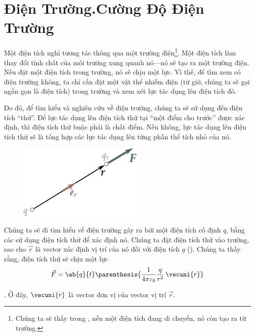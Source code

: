 \section{Điện Trường.Cường Độ Điện Trường}\label{sec:1_5}

Một điện tích nghỉ tương tác thông qua một trường điện\footnote{Chúng ta sẽ thấy trong , nếu một điện tích đang di chuyển, nó còn tạo ra từ trường.}. Một điện tích làm thay đổi tính chất của môi trường xung quanh nó---nó sẽ tạo ra một trường điện. Nếu đặt một điện tích trong trường, nó sẽ chịu một lực. Vì thế, để tìm xem có điện trường không, ta chỉ cần đặt một vật thể nhiễm điện (từ giờ, chúng ta sẽ gọi ngắn gọn là điện tích) trong trường và xem xét lực tác dụng lên điện tích đó.

Do đó, để tìm hiểu và nghiên cứu về điện trường, chúng ta sẽ sử dụng đến điện tích ``thử''. Để lực tác dụng lên điện tích thử tại ``một điểm cho trước'' được xác định, thì điện tích thử buộc phải là chất điểm. Nếu không, lực tác dụng lên điện tích thử sẽ là tổng hợp các lực tác dụng lên từng phần thể tích nhỏ của nó. 

\begin{figure}[!htb]
	\begin{center}
		\includegraphics[scale=1]{figures/ch_01/fig_1_4.pdf}
		\caption[]{}
		\label{fig:1_4}
	\end{center}
	\vspace{-0.8cm}
\end{figure}

Chúng ta sẽ đi tìm hiểu về điện trường gây ra bởi một điện tích cố định $q$, bằng các sử dụng điện tích thử để xác định nó. Chúng ta đặt điện tích thử vào trường, sao cho $\vec{r}$ là vector xác định vị trí của nó đối với điện tích $q$ (). Chúng ta thấy rằng, điện tích thử sẽ chịu một lực
\begin{equation}\label{eq:1_13}
	\vec{F} = \ab{q}{t} \parenthesis{
	\frac{1}{4\pi\varepsilon_0} \frac{q}{r^2}\,\vecuni{r}
	}
\end{equation}

. Ở đây, $\vecuni{r}$ là vector đơn vị của vector vị trí $\vec{r}$.

